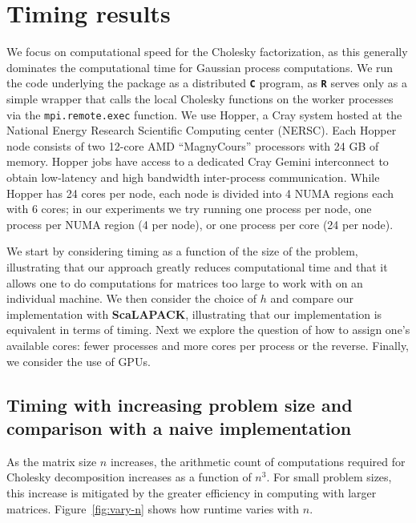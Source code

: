 \documentclass[12pt]{article}
\newcommand{\proglang}[1]{\textbf{\texttt{#1}}}
\newcommand{\pkg}[1]{\textbf{#1}}
\newcommand{\code}[1]{\texttt{#1}}
\begin{document}
\section{Timing results}
\label{sec:results}

We focus on computational speed for the Cholesky factorization, as this generally dominates the computational time for Gaussian process computations. We run the code underlying the package as a distributed \proglang{C} program, as \proglang{R} serves only as a simple wrapper that calls the local Cholesky functions on the worker processes via the \code{mpi.remote.exec} function. We use Hopper, a Cray system hosted at the National Energy Research Scientific Computing center (NERSC). Each Hopper node consists of two 12-core AMD ``MagnyCours'' processors with 24 GB of memory.  Hopper jobs have access to a dedicated Cray Gemini interconnect to obtain low-latency and high bandwidth inter-process communication.  While Hopper has 24 cores per node, each node is divided into 4 NUMA regions each with 6 cores; in our experiments we try running one process per node, one process per NUMA region (4 per node), or one process per core (24 per node).

We start by considering timing as a function of the size of the problem, illustrating that our approach greatly reduces computational time and that it allows one to do computations for matrices too large to work with on an individual machine. We then consider the choice of $h$ and compare our implementation with \pkg{ScaLAPACK}, illustrating that our implementation is equivalent in terms of timing. Next we explore the question of how to assign one's available cores: fewer processes and more cores per process or the reverse. Finally, we consider the use of GPUs.

\subsection{Timing with increasing problem size and comparison with a naive implementation}
As the matrix size \(n\) increases, the arithmetic count of computations required for Cholesky decomposition increases as a function of \(n^3\).  For small problem sizes, this increase is mitigated by the greater efficiency in computing with larger matrices.  Figure~\ref{fig:vary-n} shows how runtime varies with \(n\).
\end{document}
